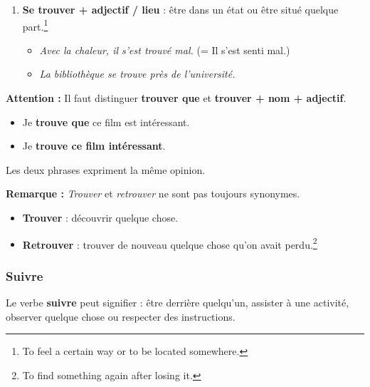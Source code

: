 \documentclass[math,code]{amznotes}
\theoremstyle{remark}
\begin{document}
\begin{enumerate}
    \item \textbf{Se trouver + adjectif / lieu} : être dans un état ou être situé quelque part.\footnote{To feel a certain way or to be located somewhere.}
    \begin{itemize}
        \item \textit{Avec la chaleur, il s'est trouvé mal.} (= Il s'est senti mal.)
        \item \textit{La bibliothèque se trouve près de l'université.}
    \end{itemize}
\end{enumerate}

\begin{notebox}
\textbf{Attention :} Il faut distinguer \textbf{trouver que} et \textbf{trouver + nom + adjectif}.

\begin{itemize}
    \item Je \textbf{trouve que} ce film est intéressant.
    \item Je \textbf{trouve ce film intéressant}.
\end{itemize}

Les deux phrases expriment la même opinion.

\textbf{Remarque :} \textit{Trouver} et \textit{retrouver} ne sont pas toujours synonymes.

\begin{itemize}
    \item \textbf{Trouver} : découvrir quelque chose.
    \item \textbf{Retrouver} : trouver de nouveau quelque chose qu'on avait perdu.\footnote{To find something again after losing it.}
\end{itemize}
\end{notebox}

\subsubsection*{Suivre}

Le verbe \textbf{suivre} peut signifier : être derrière quelqu'un, assister à une activité, observer quelque chose ou respecter des instructions.
\end{document}
